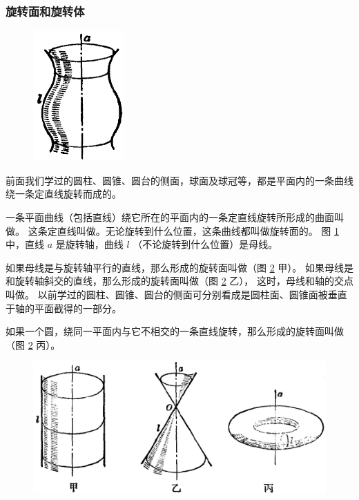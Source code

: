 \begin{lianxi}



\end{lianxi}



\subsubsection{旋转面和旋转体}

\begin{figure}
    \centering
    \includegraphics[width=3.5cm]{../pic/ltjh-ch2-55.png}
    \caption{}\label{fig:ltjh-2-55}
\end{figure}

前面我们学过的圆柱、圆锥、圆台的侧面，球面及球冠等，都是平面内的一条曲线绕一条定直线旋转而成的。

一条平面曲线（包括直线）绕它所在的平面内的一条定直线旋转所形成的曲面叫做。
这条定直线叫做。无论旋转到什么位置，这条曲线都叫做旋转面的。
图 \ref{fig:ltjh-2-55} 中，直线 $a$ 是旋转轴，曲线 $l$ （不论旋转到什么位置）是母线。

如果母线是与旋转轴平行的直线，那么形成的旋转面叫做（图 \ref{fig:ltjh-2-56} 甲）。
如果母线是和旋转轴斜交的直线，那么形成的旋转面叫做（图 \ref{fig:ltjh-2-56} 乙），
这时，母线和轴的交点叫做。
以前学过的圆柱、圆锥、圆台的侧面可分别看成是圆柱面、圆锥面被垂直于轴的平面截得的一部分。

如果一个圆，绕同一平面内与它不相交的一条直线旋转，那么形成的旋转面叫做（图 \ref{fig:ltjh-2-56} 丙）。

\begin{figure}[htbp]
    \centering
    \includegraphics[width=12cm]{../pic/ltjh-ch2-56.png}
    \caption{}\label{fig:ltjh-2-56}
\end{figure}

